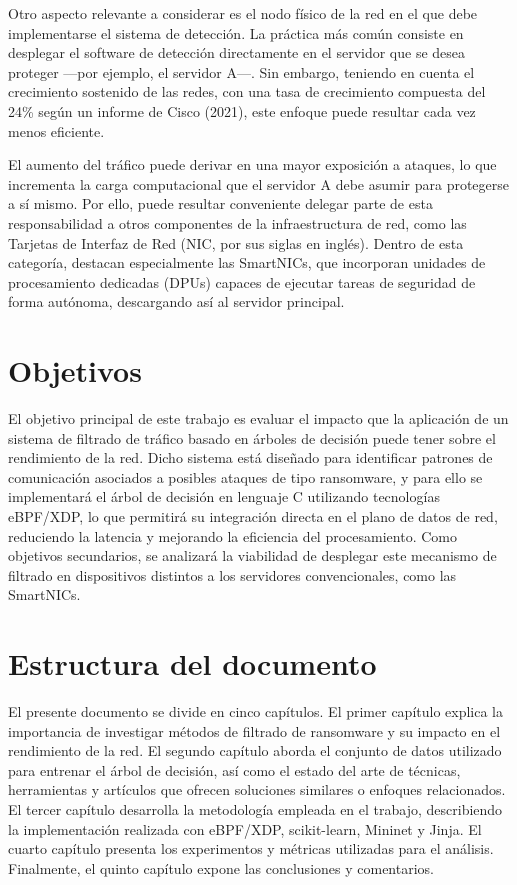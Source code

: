 Otro aspecto relevante a considerar es el nodo físico de la red en el que debe implementarse el sistema de detección. La práctica más común consiste en desplegar el software de detección directamente en el servidor que se desea proteger —por ejemplo, el servidor A—. Sin embargo, teniendo en cuenta el crecimiento sostenido de las redes, con una tasa de crecimiento compuesta del 24\% según un informe de Cisco (2021)\cite{Cisco2021}, este enfoque puede resultar cada vez menos eficiente.

El aumento del tráfico puede derivar en una mayor exposición a ataques, lo que incrementa la carga computacional que el servidor A debe asumir para protegerse a sí mismo. Por ello, puede resultar conveniente delegar parte de esta responsabilidad a otros componentes de la infraestructura de red, como las Tarjetas de Interfaz de Red (NIC, por sus siglas en inglés). Dentro de esta categoría, destacan especialmente las SmartNICs, que incorporan unidades de procesamiento dedicadas (DPUs) capaces de ejecutar tareas de seguridad de forma autónoma, descargando así al servidor principal.

\section{Objetivos}
El objetivo principal de este trabajo es evaluar el impacto que la aplicación de un sistema de filtrado de tráfico basado en árboles de decisión puede tener sobre el rendimiento de la red. Dicho sistema está diseñado para identificar patrones de comunicación asociados a posibles ataques de tipo ransomware, y para ello se implementará el árbol de decisión en lenguaje C utilizando tecnologías eBPF/XDP, lo que permitirá su integración directa en el plano de datos de red, reduciendo la latencia y mejorando la eficiencia del procesamiento. Como objetivos secundarios, se analizará la viabilidad de desplegar este mecanismo de filtrado en dispositivos distintos a los servidores convencionales, como las SmartNICs.

\section{Estructura del documento}
El presente documento se divide en cinco capítulos. El primer capítulo explica la importancia de investigar métodos de filtrado de ransomware y su impacto en el rendimiento de la red. El segundo capítulo aborda el conjunto de datos utilizado para entrenar el árbol de decisión, así como el estado del arte de técnicas, herramientas y artículos que ofrecen soluciones similares o enfoques relacionados. El tercer capítulo desarrolla la metodología empleada en el trabajo, describiendo la implementación realizada con eBPF/XDP, scikit-learn, Mininet y Jinja. El cuarto capítulo presenta los experimentos y métricas utilizadas para el análisis. Finalmente, el quinto capítulo expone las conclusiones y comentarios.
